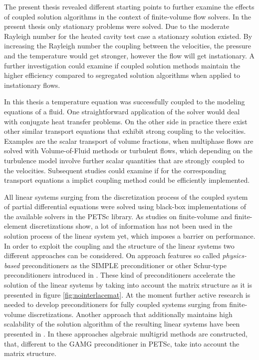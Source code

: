 The present thesis revealed different starting points to further examine the effects of coupled solution algorithms in the context of finite-volume flow solvers. In the present thesis only stationary problems were solved. Due to the moderate Rayleigh number for the heated cavity test case a stationary solution existed. By increasing the Rayleigh number the coupling between the velocities, the pressure and the temperature would get stronger, however the flow will get instationary. A further investigation could examine if coupled solution methods maintain the higher efficiency compared to segregated solution algorithms when applied to instationary flows.

In this thesis a temperature equation was successfully coupled to the modeling equations of a fluid. One straightforward application of the solver would deal with conjugate heat transfer problems. On the other side in practice there exist other similar transport equations that exhibit strong coupling to the velocities. Examples are the scalar transport of volume fractions, when multiphase flows are solved with Volume-of-Fluid methods or turbulent flows, which depending on the turbulence model involve further scalar quantities that are strongly coupled to the velocities. Subsequent studies could examine if for the corresponding transport equations a implict coupling method could be efficiently implemented.

All linear systems surging from the discretization process of the coupled system of partial differential equations were solved using black-box implementations of the available solvers in the PETSc library. As studies on finite-volume \cite{klaij13,darwish09,mangani14} and finite-element \cite{brown12,elman03,elman08,silvester01,turek02,mcinnes14} discretizations show, a lot of information has not been used in the solution process of the linear system yet, which imposes a barrier on performance. In order to exploit the coupling and the structure of the linear systems two different approaches can be considered. On approach features so called \emph{physics-based} preconditioners as the SIMPLE preconditioner or other Schur-type preconditioners introduced in \cite{klaij13,elman08}. These kind of preconditioners accelerate the solution of the linear systems by taking into account the matrix structure as it is presented in figure \ref{fig:nointerlacemat}. At the moment further active research is needed to develop preconditioners for fully coupled systems surging from finite-volume discretizations. Another approach that additionally maintains high scalability of the solution algorithm of the resulting linear systems have been presented in \cite{darwish09,mangani14}. In these approaches algebraic multigrid methods are constructed, that, different to the GAMG preconditioner in PETSc, take into account the matrix structure.

